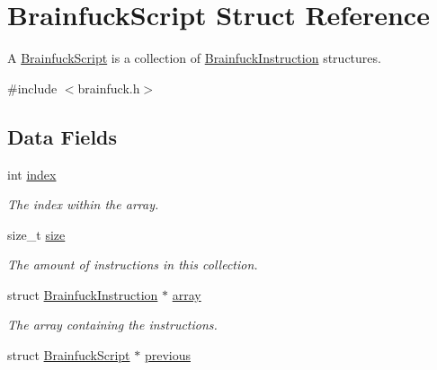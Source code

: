 \hypertarget{structBrainfuckScript}{}\section{Brainfuck\+Script Struct Reference}
\label{structBrainfuckScript}


A \hyperlink{structBrainfuckScript}{Brainfuck\+Script} is a collection of \hyperlink{structBrainfuckInstruction}{Brainfuck\+Instruction} structures.  




{\ttfamily \#include $<$brainfuck.\+h$>$}

\subsection*{Data Fields}
\begin{DoxyCompactItemize}
\item 
\hypertarget{structBrainfuckScript_a22127183a3511552cd3b917f0d29f65c}{}int \hyperlink{structBrainfuckScript_a22127183a3511552cd3b917f0d29f65c}{index}\label{structBrainfuckScript_a22127183a3511552cd3b917f0d29f65c}

\begin{DoxyCompactList}\small\item\em The index within the array. \end{DoxyCompactList}\item 
\hypertarget{structBrainfuckScript_ab3c5fad351e3ccf03ed6fab6793e0294}{}size\+\_\+t \hyperlink{structBrainfuckScript_ab3c5fad351e3ccf03ed6fab6793e0294}{size}\label{structBrainfuckScript_ab3c5fad351e3ccf03ed6fab6793e0294}

\begin{DoxyCompactList}\small\item\em The amount of instructions in this collection. \end{DoxyCompactList}\item 
\hypertarget{structBrainfuckScript_a8bad560a270bd035906ef5c286581d16}{}struct \hyperlink{structBrainfuckInstruction}{Brainfuck\+Instruction} $\ast$ \hyperlink{structBrainfuckScript_a8bad560a270bd035906ef5c286581d16}{array}\label{structBrainfuckScript_a8bad560a270bd035906ef5c286581d16}

\begin{DoxyCompactList}\small\item\em The array containing the instructions. \end{DoxyCompactList}\item 
\hypertarget{structBrainfuckScript_a6f6da2aa891d85328e4ee5aeb78ea2fa}{}struct \hyperlink{structBrainfuckScript}{Brainfuck\+Script} $\ast$ \hyperlink{structBrainfuckScript_a6f6da2aa891d85328e4ee5aeb78ea2fa}{previous}\label{structBrainfuckScript_a6f6da2aa891d85328e4ee5aeb78ea2fa}


\end{DoxyCompactItemize}
